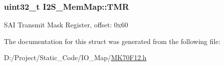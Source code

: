 \subsubsection[{T\+M\+R}]{\setlength{\rightskip}{0pt plus 5cm}uint32\+\_\+t I2\+S\+\_\+\+Mem\+Map\+::\+T\+M\+R}\label{struct_i2_s___mem_map_a52b2dd69044a5f8c990749c314664ae1}
S\+A\+I Transmit Mask Register, offset\+: 0x60 

The documentation for this struct was generated from the following file\+:\begin{DoxyCompactItemize}
\item 
D\+:/\+Project/\+Static\+\_\+\+Code/\+I\+O\+\_\+\+Map/\hyperlink{_m_k70_f12_8h}{M\+K70\+F12.\+h}\end{DoxyCompactItemize}
